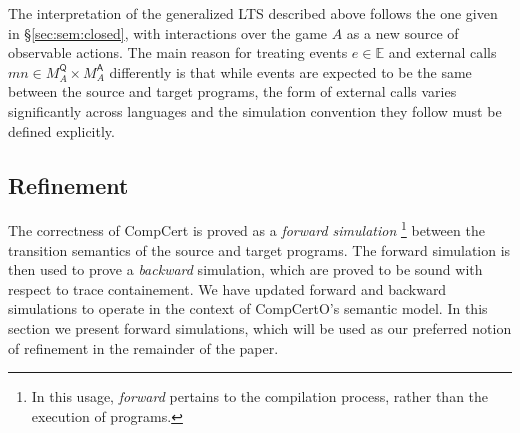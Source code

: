 \documentclass[sigplan,10pt,review,anonymous]{acmart}\settopmatter{printfolios=true,printccs=false,printacmref=false}
\newcommand{\kw}[1]{\ensuremath{ \mathsf{#1} }}
\newcommand{\bind}{\gg\!\!=}
\begin{document}
The interpretation of the generalized LTS described above
follows the one given in \S\ref{sec:sem:closed},
with interactions over the game $A$
as a new source of observable actions.
The main reason for treating
events $e \in \mathbb{E}$ and
external calls $m n \in M_A^\kw{Q} \times M_A^\kw{A}$
differently is that
while events are expected to be the same
between the source and target programs,
the form of external calls varies significantly
across languages
and the simulation convention they follow
must be defined explicitly.




\subsection{Refinement} \label{sec:sem:ref} %

The correctness of CompCert is proved as a
\emph{forward simulation}%
\footnote{In this usage, \emph{forward} pertains to
  the compilation process,
  rather than the execution of programs.}
between the transition semantics of the source and target programs.
The forward simulation is then used to prove a \emph{backward} simulation,
which are proved to be sound with respect to trace containement.
We have updated forward and backward simulations to
operate in the context of CompCertO's semantic model.
In this section we present forward simulations,
which will be used as our preferred notion of refinement
in the remainder of the paper.
\end{document}
